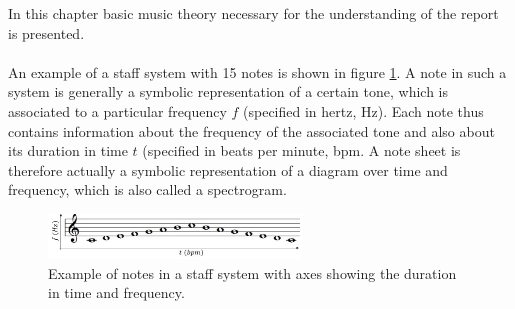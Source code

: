 In this chapter basic music theory necessary for the understanding of the report is presented.
\\ \\
An example of a staff system with 15 notes is shown in figure \ref{fig:cmajor}. A note in such a system is generally a symbolic representation of a certain tone, which is associated to a particular frequency $f$ (specified in hertz, Hz). Each note thus contains information about the frequency of the associated tone and also about its duration in time $t$ (specified in beats per minute, bpm. A note sheet is therefore actually a symbolic representation of a diagram over time and frequency, which is also called a spectrogram.

\begin{figure}[H]
    \centering
    \includegraphics[width = 0.6\textwidth]{figures/Music/Cmajor.jpg}
    \caption{Example of notes in a staff system with axes showing the duration in time and frequency.}
    \label{fig:cmajor}
\end{figure}

